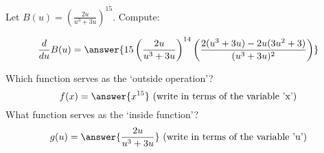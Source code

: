 \documentclass{ximera}
\author{Bobby Ramsey}
\begin{document}
\begin{exercise}

	Let $B(u) = \left( \frac{2u}{u^3+3u}\right)^{15}$. Compute:

	\[ \dd{u}B(u) =\answer{ 15 \left(\frac{2u}{u^3+3u}\right)^{14} \left( \frac{2(u^3+3u)-2u(3u^2+3)}{(u^3+3u)^2} \right)  } \]

	\begin{hint}
		Which function serves as the `outside operation'? 
			\[f(x) = \answer{x^{15}} \text{ (write in terms of the variable 'x')} \]
		What function serves as the `inside function'?
			\[g(u) = \answer{\frac{2u}{u^3+3u}} \text{ (write in terms of the variable 'u')} \]
	\end{hint}

\end{exercise}
\end{document}
